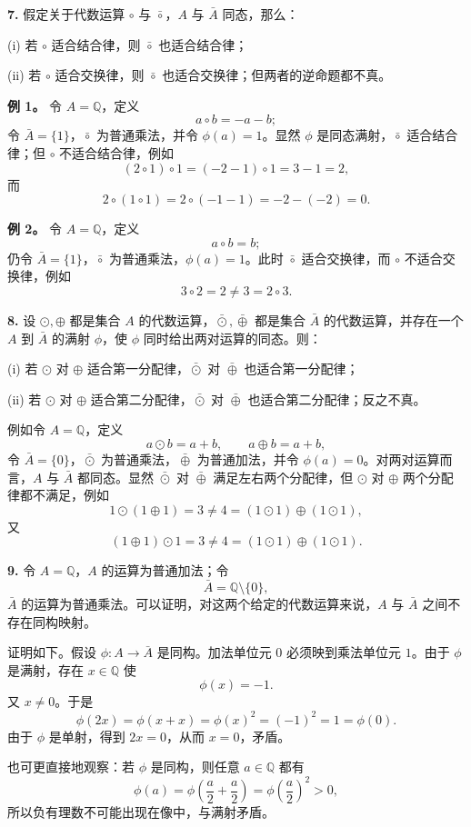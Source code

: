 \textbf{7.} 假定关于代数运算 $\circ$ 与 $\bar\circ$，$A$ 与 $\bar A$ 同态，那么：

(i) 若 $\circ$ 适合结合律，则 $\bar\circ$ 也适合结合律；

(ii) 若 $\circ$ 适合交换律，则 $\bar\circ$ 也适合交换律；但两者的逆命题都不真。

\textbf{例 1。} 令 $A=\mathbb Q$，定义
\[
a\circ b=-a-b;
\]
令 $\bar A=\{1\}$，$\bar\circ$ 为普通乘法，并令 $\phi(a)=1$。显然 $\phi$ 是同态满射，$\bar\circ$ 适合结合律；但 $\circ$ 不适合结合律，例如
\[
(2\circ1)\circ1=(-2-1)\circ1=3-1=2,
\]
而
\[
2\circ(1\circ1)=2\circ(-1-1)=-2-(-2)=0.
\]

\textbf{例 2。} 令 $A=\mathbb Q$，定义
\[
a\circ b=b;
\]
仍令 $\bar A=\{1\}$，$\bar\circ$ 为普通乘法，$\phi(a)=1$。此时 $\bar\circ$ 适合交换律，而 $\circ$ 不适合交换律，例如
\[
3\circ2=2\ne3=2\circ3.
\]

\textbf{8.} 设 $\odot,\oplus$ 都是集合 $A$ 的代数运算，$\bar\odot,\bar\oplus$ 都是集合 $\bar A$ 的代数运算，并存在一个 $A$ 到 $\bar A$ 的满射 $\phi$，使 $\phi$ 同时给出两对运算的同态。则：

(i) 若 $\odot$ 对 $\oplus$ 适合第一分配律，$\bar\odot$ 对 $\bar\oplus$ 也适合第一分配律；

(ii) 若 $\odot$ 对 $\oplus$ 适合第二分配律，$\bar\odot$ 对 $\bar\oplus$ 也适合第二分配律；反之不真。

例如令 $A=\mathbb Q$，定义
\[
a\odot b=a+b,
\qquad
a\oplus b=a+b,
\]
令 $\bar A=\{0\}$，$\bar\odot$ 为普通乘法，$\bar\oplus$ 为普通加法，并令 $\phi(a)=0$。对两对运算而言，$A$ 与 $\bar A$ 都同态。显然 $\bar\odot$ 对 $\bar\oplus$ 满足左右两个分配律，但 $\odot$ 对 $\oplus$ 两个分配律都不满足，例如
\[
1\odot(1\oplus1)=3\ne4=(1\odot1)\oplus(1\odot1),
\]
又
\[
(1\oplus1)\odot1=3\ne4=(1\odot1)\oplus(1\odot1).
\]

\textbf{9.} 令 $A=\mathbb Q$，$A$ 的运算为普通加法；令
\[
\bar A=\mathbb Q\setminus\{0\},
\]
$\bar A$ 的运算为普通乘法。可以证明，对这两个给定的代数运算来说，$A$ 与 $\bar A$ 之间不存在同构映射。

证明如下。假设 $\phi:A\to\bar A$ 是同构。加法单位元 $0$ 必须映到乘法单位元 $1$。由于 $\phi$ 是满射，存在 $x\in\mathbb Q$ 使
\[
\phi(x)=-1.
\]
又 $x\ne0$。于是
\[
\phi(2x)=\phi(x+x)=\phi(x)^2=(-1)^2=1=\phi(0).
\]
由于 $\phi$ 是单射，得到 $2x=0$，从而 $x=0$，矛盾。

也可更直接地观察：若 $\phi$ 是同构，则任意 $a\in\mathbb Q$ 都有
\[
\phi(a)=\phi\left(\frac a2+\frac a2\right)=\phi\left(\frac a2\right)^2>0,
\]
所以负有理数不可能出现在像中，与满射矛盾。

